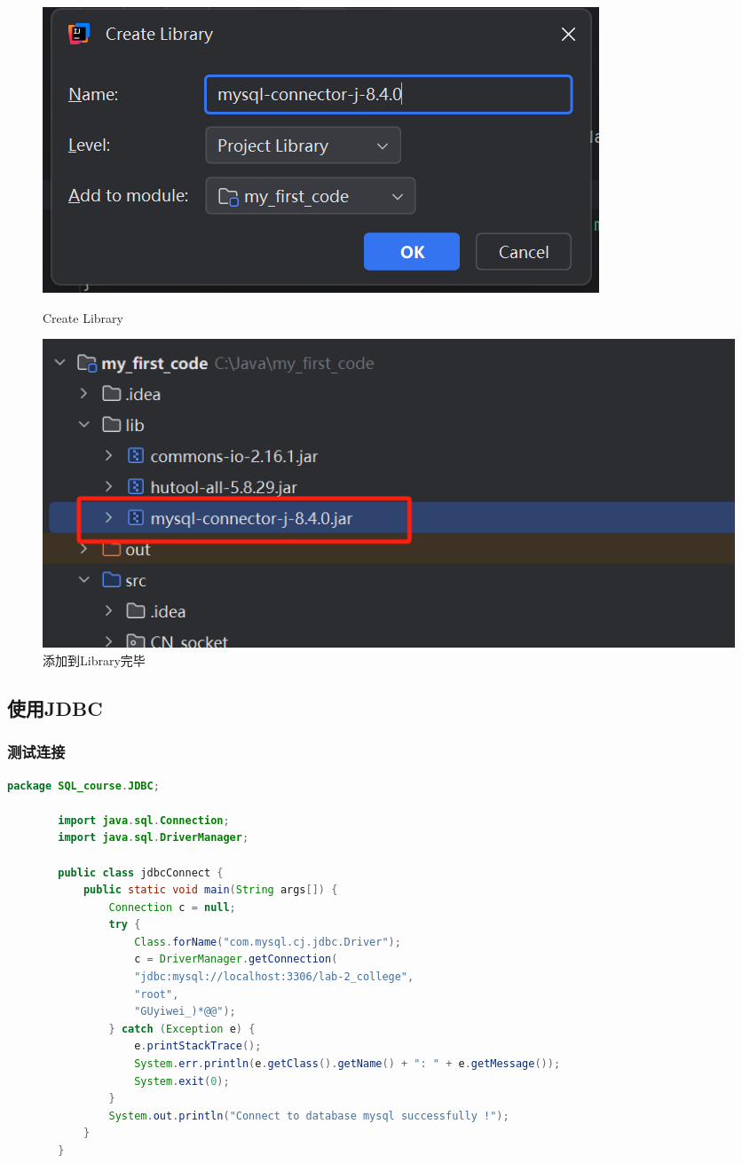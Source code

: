\documentclass{article}
\begin{document}
	\begin{figure}[H]
		\centering
		\begin{minipage}[b]{0.45\textwidth}
			\includegraphics[width=\textwidth]{./images/4.添加到Library.png}
			\caption{Create Library}
		\end{minipage}
		\hfill
		\begin{minipage}[b]{0.45\textwidth}
			\includegraphics[width=\textwidth]{./images/5.添加到Library.png}
			\caption{添加到Library完毕}
		\end{minipage}
	\end{figure}
	
	\subsection{使用JDBC}
	
	\subsubsection{测试连接}
	
	\begin{lstlisting}[language=java, title=jdbcConnect, tabsize=4]
		package SQL_course.JDBC;
		
		import java.sql.Connection;
		import java.sql.DriverManager;
		
		public class jdbcConnect {
			public static void main(String args[]) {
				Connection c = null;
				try {
					Class.forName("com.mysql.cj.jdbc.Driver");
					c = DriverManager.getConnection(
					"jdbc:mysql://localhost:3306/lab-2_college",
					"root",
					"GUyiwei_)*@@");
				} catch (Exception e) {
					e.printStackTrace();
					System.err.println(e.getClass().getName() + ": " + e.getMessage());
					System.exit(0);
				}
				System.out.println("Connect to database mysql successfully !");
			}
		}
		
	\end{lstlisting}
	
\end{document}
